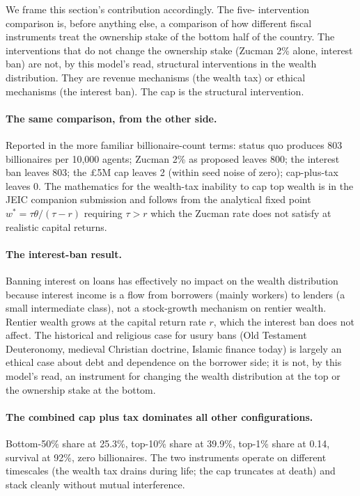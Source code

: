 \documentclass[11pt]{article}
\begin{document}
We frame this section's contribution accordingly.  The five-
intervention comparison is, before anything else, a comparison of
how different fiscal instruments treat the ownership stake of the
bottom half of the country.  The interventions that do not change
the ownership stake (Zucman 2\% alone, interest ban) are not, by
this model's read, structural interventions in the wealth
distribution.  They are revenue mechanisms (the wealth tax) or
ethical mechanisms (the interest ban).  The cap is the structural
intervention.

\paragraph{The same comparison, from the other side.}  Reported
in the more familiar billionaire-count terms: status quo produces
803 billionaires per 10{,}000 agents; Zucman 2\% as proposed
leaves 800; the interest ban leaves 803; the \pounds 5M cap leaves
2 (within seed noise of zero); cap-plus-tax leaves 0.  The
mathematics for the wealth-tax inability to cap top wealth is in
the JEIC companion submission and follows from the analytical
fixed point $w^* = \tau \theta / (\tau - r)$ requiring $\tau > r$
which the Zucman rate does not satisfy at realistic capital
returns.

\paragraph{The interest-ban result.}  Banning interest on loans
has effectively no impact on the wealth distribution because
interest income is a flow from borrowers (mainly workers) to
lenders (a small intermediate class), not a stock-growth mechanism
on rentier wealth.  Rentier wealth grows at the capital return
rate $r$, which the interest ban does not affect.  The historical
and religious case for usury bans
(Old Testament Deuteronomy, medieval Christian doctrine, Islamic
finance today) is largely an ethical case about debt and
dependence on the borrower side; it is not, by this model's read,
an instrument for changing the wealth distribution at the top or
the ownership stake at the bottom.

\paragraph{The combined cap plus tax dominates all other
configurations.}  Bottom-50\% share at 25.3\%, top-10\% share at
39.9\%, top-1\% share at 0.14, survival at 92\%, zero billionaires.
The two instruments operate on different timescales (the wealth
tax drains during life; the cap truncates at death) and stack
cleanly without mutual interference.
\end{document}
